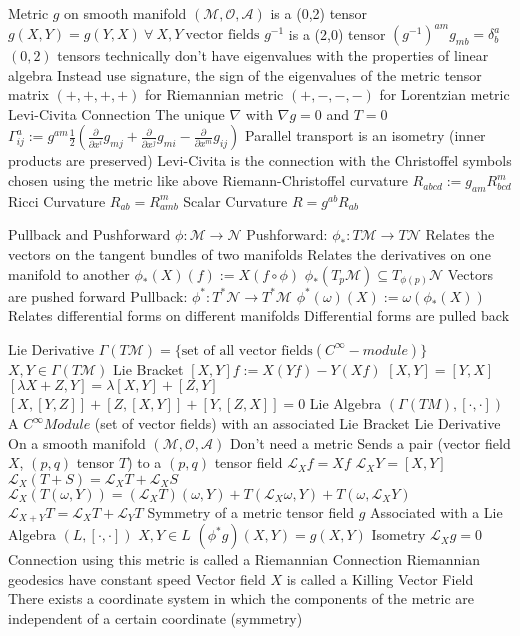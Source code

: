 \documentclass[14pt]{extarticle}
\begin{document}
\begin{outline}
		\1	Metric $g$ on smooth manifold $(\mathcal{M},\mathcal{O},\mathcal{A})$ is a (0,2) tensor
			\2	$g(X,Y) = g(Y,X)~\forall~X,Y~\text{vector fields}$
			\2	$g^{-1}$ is a (2,0) tensor
			\2	$(g^{-1})^{am}g_{mb} = \delta^a_b$
			\2	$(0,2)$ tensors technically don't have eigenvalues with the properties of linear algebra
				\3	Instead use signature, the sign of the eigenvalues of the metric tensor matrix
				\3	$(+,+,+,+)$ for Riemannian metric	
				\3	$(+,-,-,-)$ for Lorentzian metric
			\2	Levi-Civita Connection
				\3	The unique $\nabla$ with $\nabla g = 0$ and $T = 0$
				\3	$\Gamma^a_{ij} := g^{am} \frac{1}{2}(\frac{\partial}{\partial x^i}g_{mj} +
							\frac{\partial}{\partial x^j}g_{mi} - \frac{\partial}{\partial x^m}g_{ij})$
				\3	Parallel transport is an isometry (inner products are preserved)
				\3	Levi-Civita is the connection with the Christoffel symbols chosen using the
						metric like above
			\2	Riemann-Christoffel curvature
				\3	$R_{abcd} := g_{am}R^m_{bcd}$
			\2	Ricci Curvature
				\3	$R_{ab} = R^m_{amb}$
			\2	Scalar Curvature
				\3	$R = g^{ab}R_{ab}$

		\1	Pullback and Pushforward
			\2	$\phi : \mathcal{M} \rightarrow \mathcal{N}$
			\2	Pushforward:	$\phi_* : T\mathcal{M} \rightarrow T\mathcal{N}$
				\3	Relates the vectors on the tangent bundles of two manifolds
				\3	Relates the derivatives on one manifold to another
				\3	$\phi_*(X)(f) := X(f \circ \phi)$
				\3	$\phi_*(T_p\mathcal{M}) \subseteq T_{\phi(p)}\mathcal{N}$
				\3	Vectors are pushed forward
			\2	Pullback:	$\phi^* : T^*\mathcal{N} \rightarrow T^*\mathcal{M}$
				\3	$\phi^*(\omega)(X) := \omega(\phi_*(X))$
				\3	Relates differential forms on different manifolds
				\3	Differential forms are pulled back

		\1	Lie Derivative
			\2	$\Gamma(T\mathcal{M}) = \{\text{set of all vector fields}(C^{\infty}-module)\}$
				\3	$X,Y \in \Gamma(T\mathcal{M})$
			\2	Lie Bracket
				\3	$[X,Y]f := X(Yf) - Y(Xf)$
				\3	$[X,Y] = [Y,X]$
				\3	$[\lambda X + Z, Y] = \lambda [X,Y] + [Z,Y]$
				\3	$[X,[Y,Z]] + [Z,[X,Y]] + [Y,[Z,X]] = 0$
			\2	Lie Algebra $(\Gamma(TM),[\cdot,\cdot])$
				\3	A $C^{\infty} Module$ (set of vector fields) with an associated Lie Bracket
			\2	Lie Derivative
				\3	On a smooth manifold $(\mathcal{M},\mathcal{O},\mathcal{A})$
					\4	Don't need a metric
				\3	Sends a pair (vector field $X$, $(p,q)$ tensor $T$) to a $(p,q)$ tensor field
				\3	$\mathcal{L}_Xf = Xf$
				\3	$\mathcal{L}_XY = [X,Y]$	
				\3	$\mathcal{L}_X(T + S) = \mathcal{L}_XT + \mathcal{L}_XS$
				\3	$\mathcal{L}_X(T(\omega,Y)) = (\mathcal{L}_XT)(\omega,Y) + T(\mathcal{L}_X\omega,Y) + T(\omega,\mathcal{L}_XY)$
				\3	$\mathcal{L}_{X + Y} T = \mathcal{L}_XT + \mathcal{L}_YT$
			\2	Symmetry of a metric tensor field $g$
				\3	Associated with a Lie Algebra $(L,[\cdot,\cdot])$
				\3	$X,Y \in L$	
				\3	$(\phi^*g)(X,Y) = g(X,Y)$
				\3	Isometry
				\3	$\mathcal{L}_Xg = 0$
				\3	Connection using this metric is called a Riemannian Connection
				\3	Riemannian geodesics have constant speed
				\3	Vector field $X$ is called a Killing Vector Field
				\3	There exists a coordinate system in which the components of the metric are
						independent of a certain coordinate (symmetry)

	\end{outline}
\end{document}
